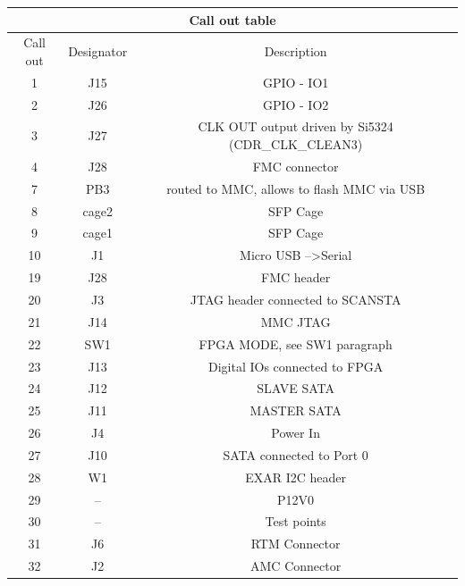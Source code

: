 \begin{longtable}{|c|c|c|} \hline
	\multicolumn{3}{|c|}{Call out table } \\ \hline	
	Call out & Designator & Description \\ \hline
	1 & J15 & GPIO - IO1 \\ \hline
	2 & J26 & GPIO - IO2 \\ \hline
	3 & J27 & CLK OUT output driven by Si5324 (CDR\_CLK\_CLEAN3) \\ \hline
	4 & J28 & FMC connector \\ \hline
	7 & PB3 & routed to MMC, allows to flash MMC via USB \\ \hline
	8 & cage2 & SFP Cage \\ \hline
	9 & cage1 & SFP Cage \\ \hline
	10 & J1 & Micro USB -->Serial \\ \hline
	19 & J28 & FMC header \\ \hline
	20 & J3 & JTAG header connected to SCANSTA\\ \hline
	21 & J14 & MMC JTAG \\ \hline
	22 & SW1 & FPGA MODE, see SW1 paragraph \\ \hline
	23 & J13 & Digital IOs connected to FPGA \\ \hline
	24 & J12 & SLAVE SATA \\ \hline
	25 & J11 & MASTER SATA \\ \hline
	26 & J4 & Power In \\ \hline
	27 & J10 & SATA connected to Port 0 \\ \hline
	28 & W1 & EXAR I2C header \\ \hline
	29 & -- & P12V0 \\ \hline
	30 & -- &  Test points \\ \hline
	31 & J6 & RTM Connector \\ \hline
	32 & J2 & AMC Connector \\ \hline
\end{longtable}

